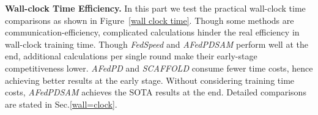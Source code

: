 \textbf{Wall-clock Time Efficiency.} In this part we test the practical wall-clock time comparisons as shown in Figure~\ref{wall clock time}. Though some methods are communication-efficiency, complicated calculations hinder the real efficiency in wall-clock training time. Though \textit{FedSpeed} and \textit{AFedPDSAM} perform well at the end, additional calculations per single round make their early-stage competitiveness lower. \textit{AFedPD} and \textit{SCAFFOLD} consume fewer time costs, hence achieving better results at the early stage. Without considering training time costs, \textit{AFedPDSAM} achieves the SOTA results at the end. Detailed comparisons are stated in Sec.\ref{wall=clock}.
